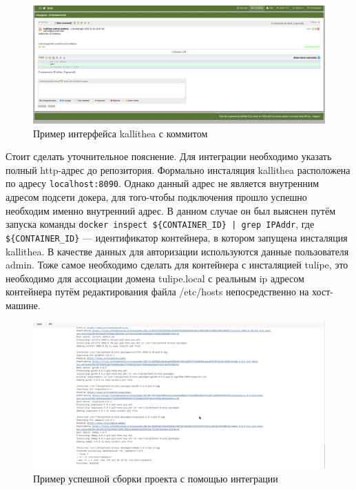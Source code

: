 \documentclass[a4paper]{extarticle}
\begin{document}
\begin{figure}[H]
\includegraphics[width=\textwidth,height=\textheight,keepaspectratio]{kallithea.png}
\caption{Пример интерфейса kallithea с коммитом}
\end{figure}

Стоит сделать уточнительное пояснение. Для интеграции необходимо указать полный http-адрес до репозитория. Формально инсталяция kallithea расположена по адресу \texttt{localhost:8090}. Однако данный адрес не является внутренним адресом подсети докера, для того-чтобы подключения прошло успешно необходим именно внутренний адрес. В данном случае он был выяснен путём запуска команды
\verb#docker inspect ${CONTAINER_ID} | grep IPAddr#, где \verb#${CONTAINER_ID}# --- идентификатор контейнера, в котором запущена инсталяция kallithea. В качестве данных  для авторизации используются данные пользователя admin. Тоже самое необходимо сделать для контейнера с инсталяцией tulipe, это необходимо для ассоциации домена tulipe.local с реальным ip адресом контейнера путём редактирования файла /etc/hosts непосредственно на хост-машине. 

\begin{figure}[H]
\includegraphics[width=\textwidth,height=\textheight,keepaspectratio]{jenk_build.png}
\caption{Пример успешной сборки проекта с помощью интеграции}
\end{figure}
\end{document}

